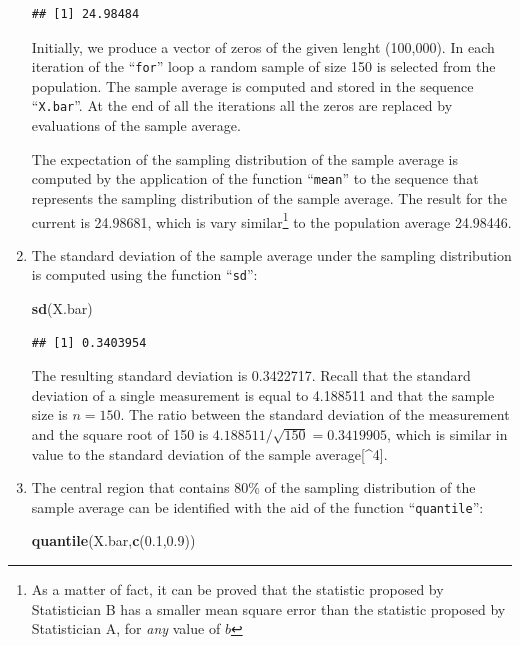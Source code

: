 \documentclass[
]{krantz}
\makeatletter
\newenvironment{Shaded}{\begin{snugshade}}{\end{snugshade}}
\newcommand{\FloatTok}[1]{\textcolor[rgb]{0.00,0.00,0.81}{#1}}
\newcommand{\KeywordTok}[1]{\textcolor[rgb]{0.13,0.29,0.53}{\textbf{#1}}}
\newcommand{\NormalTok}[1]{#1}
\newenvironment{kframe}{%
\medskip{}
\setlength{\fboxsep}{.8em}
 \def\at@end@of@kframe{}%
 \ifinner\ifhmode%
  \def\at@end@of@kframe{\end{minipage}}%
  \begin{minipage}{\columnwidth}%
 \fi\fi%
 \def\FrameCommand##1{\hskip\@totalleftmargin \hskip-\fboxsep
 \colorbox{shadecolor}{##1}\hskip-\fboxsep
     \hskip-\linewidth \hskip-\@totalleftmargin \hskip\columnwidth}%
 \MakeFramed {\advance\hsize-\width
   \@totalleftmargin\z@ \linewidth\hsize
   \@setminipage}}%
 {\par\unskip\endMakeFramed%
 \at@end@of@kframe}
\renewenvironment{Shaded}{\begin{kframe}}{\end{kframe}}
\theoremstyle{definition}
\theoremstyle{definition}
\theoremstyle{definition}
\theoremstyle{remark}
\makeatother
\begin{document}
\begin{enumerate}
\begin{verbatim}
## [1] 24.98484
\end{verbatim}

  Initially, we produce a vector of zeros of the given lenght (100,000).
  In each iteration of the ``\texttt{for}'' loop a random sample of size 150 is
  selected from the population. The sample average is computed and stored
  in the sequence ``\texttt{X.bar}''. At the end of all the iterations all the
  zeros are replaced by evaluations of the sample average.

  The expectation of the sampling distribution of the sample average is
  computed by the application of the function ``\texttt{mean}'' to the sequence
  that represents the sampling distribution of the sample average. The
  result for the current is 24.98681, which is vary similar\footnote{As a matter of fact, it can be proved that the statistic proposed
    by Statistician B has a smaller mean square error than the statistic
    proposed by Statistician A, for \emph{any} value of \(b\)} to the
  population average 24.98446.
\item
  The standard deviation of the sample
  average under the sampling distribution is computed using the function
  ``\texttt{sd}'':

\begin{Shaded}
\begin{Highlighting}[]
\KeywordTok{sd}\NormalTok{(X.bar)}
\end{Highlighting}
\end{Shaded}

\begin{verbatim}
## [1] 0.3403954
\end{verbatim}

  The resulting standard deviation is 0.3422717. Recall that the standard
  deviation of a single measurement is equal to 4.188511 and that the
  sample size is \(n=150\). The ratio between the standard deviation of the
  measurement and the square root of 150 is
  \(4.188511/\sqrt{150} =0.3419905\), which is similar in value to the
  standard deviation of the sample average{[}\^{}4{]}.
\item
  The central region that contains 80\%
  of the sampling distribution of the sample average can be identified
  with the aid of the function ``\texttt{quantile}'':

\begin{Shaded}
\begin{Highlighting}[]
\KeywordTok{quantile}\NormalTok{(X.bar,}\KeywordTok{c}\NormalTok{(}\FloatTok{0.1}\NormalTok{,}\FloatTok{0.9}\NormalTok{))}
\end{Highlighting}
\end{Shaded}


\end{enumerate}
\end{document}
